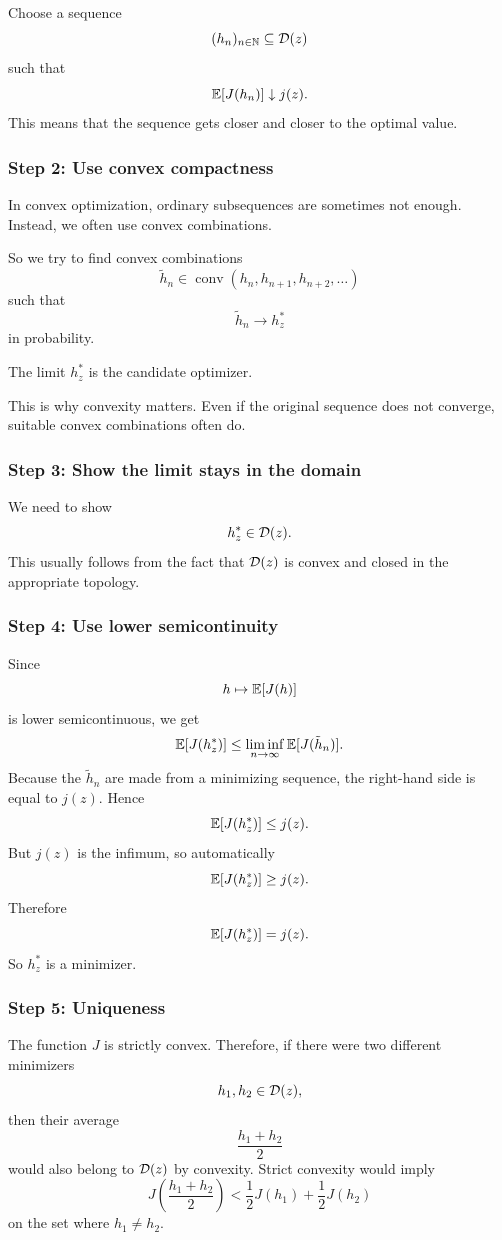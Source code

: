 Choose a sequence
\[
    (h_n)_{n\in\mathbb{N}}\subseteq \mathcal{D}(z)
\]
such that
\[
    \mathbb{E}[J(h_n)]\downarrow j(z).
\]
This means that the sequence gets closer and closer to the optimal value.

\subsubsection*{Step 2: Use convex compactness}

In convex optimization, ordinary subsequences are sometimes not enough. Instead, we often use convex combinations.

So we try to find convex combinations
\[
    \tilde h_n
    \in
    \operatorname{conv}(h_n,h_{n+1},h_{n+2},\dots)
\]
such that
\[
    \tilde h_n \to h_z^*
\]
in probability.

The limit $h_z^*$ is the candidate optimizer.

\begin{opomba}
This is why convexity matters. Even if the original sequence does not converge, suitable convex combinations often do.
\end{opomba}

\subsubsection*{Step 3: Show the limit stays in the domain}

We need to show
\[
    h_z^*\in\mathcal{D}(z).
\]
This usually follows from the fact that $\mathcal{D}(z)$ is convex and closed in the appropriate topology.

\subsubsection*{Step 4: Use lower semicontinuity}

Since
\[
    h\mapsto \mathbb{E}[J(h)]
\]
is lower semicontinuous, we get
\[
    \mathbb{E}[J(h_z^*)]
    \leq
    \liminf_{n\to\infty}\mathbb{E}[J(\tilde h_n)].
\]
Because the $\tilde h_n$ are made from a minimizing sequence, the right-hand side is equal to $j(z)$. Hence
\[
    \mathbb{E}[J(h_z^*)]\leq j(z).
\]
But $j(z)$ is the infimum, so automatically
\[
    \mathbb{E}[J(h_z^*)]\geq j(z).
\]
Therefore
\[
    \mathbb{E}[J(h_z^*)]=j(z).
\]
So $h_z^*$ is a minimizer.

\subsubsection*{Step 5: Uniqueness}

The function $J$ is strictly convex. Therefore, if there were two different minimizers
\[
    h_1,h_2\in\mathcal{D}(z),
\]
then their average
\[
    \frac{h_1+h_2}{2}
\]
would also belong to $\mathcal{D}(z)$ by convexity. Strict convexity would imply
\[
    J\left(\frac{h_1+h_2}{2}\right)
    <
    \frac{1}{2}J(h_1)+\frac{1}{2}J(h_2)
\]
on the set where $h_1\neq h_2$.


